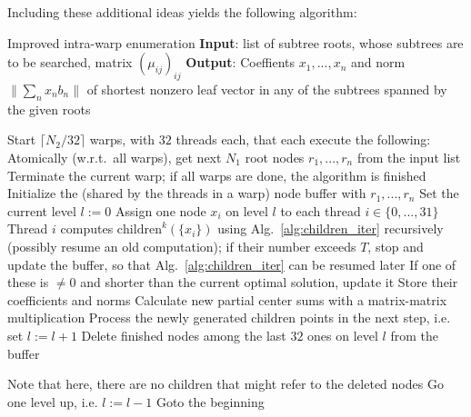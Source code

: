 \documentclass{scrartcl}
\begin{document}
    Including these additional ideas yields the following algorithm:
    \begin{algorithm}[H]
        \caption{
            Improved intra-warp enumeration\label{alg:warp_enum_complex}
            \newline
            \textbf{Input}: list of subtree roots, whose subtrees are to be searched, matrix $(\mu_{ij})_{ij}$
            \newline
            \textbf{Output}: Coeffients $x_1, ..., x_n$ and norm $\| \sum_n x_n b_n \|$ of shortest nonzero leaf vector in any of the subtrees spanned by the given roots
        }
        \begin{algorithmic}
            \STATE Start $\lceil N_2 / 32 \rceil$ warps, with $32$ threads each, that each execute the following:
            \STATE Atomically (w.r.t.\ all warps), get next $N_1$ root nodes $r_1, ..., r_n$ from the input list
                \STATE Terminate the current warp; if all warps are done, the algorithm is finished
            \ENDIF
            \STATE Initialize the (shared by the threads in a warp) node buffer with $r_1, ..., r_n$
            \STATE Set the current level $l := 0$
                    \STATE Assign one node $x_i$ on level $l$ to each thread $i \in \{0, ..., 31\}$
                    \STATE Thread $i$ computes $\mathrm{children}^k(\{x_i\})$ using Alg.\ \ref{alg:children_iter} recursively (possibly resume an old computation);
                    if their number exceeds $T$, stop and update the buffer, so that Alg.\ \ref{alg:children_iter} can be resumed later
                        \STATE If one of these is $\neq 0$ and shorter than the current optimal solution, update it
                    \ELSE
                        \STATE Store their coefficients and norms
                        \STATE Calculate new partial center sums with a matrix-matrix multiplication
                    \ENDIF
                \ENDWHILE
                    \STATE Process the newly generated children points in the next step, i.e. set $l := l + 1$
                \ELSE
                    \STATE Delete finished nodes among the last $32$ ones on level $l$ from the buffer

                    Note that here, there are no children that might refer to the deleted nodes
                        \STATE Go one level up, i.e. $l := l - 1$
                    \ENDIF
                \ENDIF
            \ENDWHILE
            \STATE Goto the beginning
        \end{algorithmic}
    \end{algorithm}
\end{document}
